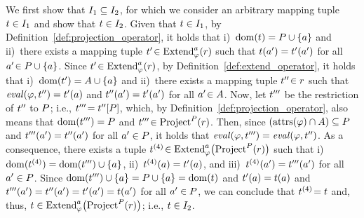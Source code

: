 	We first show that $I_1 \subseteq I_2$, for which we consider an arbitrary mapping tuple~$t \in I_1$ and show that $t \in I_2$.
	Given that $t \in I_1$, by Definition~\ref{def:projection_operator}, it holds that i)~$\mathrm{dom}(t)=P \cup \{a\}$ and ii)~there exists a mapping tuple $t'\! \in \text{Extend}_{\varphi}^{a}(r)$ such that $t(a') = t'(a')$ for all $a'\! \in P \cup \{a\}$.
	Since $t'\! \in \text{Extend}_{\varphi}^{a}(r)$, by Definition~\ref{def:extend_operator}, it holds that i)~$\mathrm{dom}(t') = A \cup \{a\}$ and ii)~there exists a mapping tuple $t''\! \in r$ such that $\mathit{eval}(\varphi,t'') = t'(a)$ and $t''(a') = t'(a')$ for all $a'\! \in A$.
	Now, let $t'''$ be the restriction of $t''$ to $P$; i.e., $t'''\! = t''[P]$, which, by Definition~\ref{def:projection_operator}, also means that $\mathrm{dom}(t''') = P$ and $t'''\! \in \text{Project}^{P}(r)$.
	Then, since $( \mathrm{attrs}(\varphi) \cap A ) \subseteq P$ and $t'''(a') = t''(a')$ for all $a' \in P$, it holds that $\mathit{eval}(\varphi,t''') = \mathit{eval}(\varphi,t'')$.
	As a consequence, there exists a tuple $t^{(4)}\! \in \text{Extend}_{\varphi}^{a}\bigl( \text{Project}^{P}(r) \bigr)$ such that i)~$\mathrm{dom}(t^{(4)}) = \mathrm{dom}(t''') \cup \{a\}$, ii)~$t^{(4)}(a) = t'(a)$, and iii)~$t^{(4)}(a') = t'''(a')$ for all $a' \in P$.
	Since $\mathrm{dom}(t''') \cup \{a\} = P \cup \{a\} = \mathrm{dom}(t)$ and $t'(a) = t(a)$ and $t'''(a') = t''(a') = t'(a') = t(a')$ for all $a' \in P$, we can conclude that $t^{(4)}\! = t$ and, thus, $t \in \text{Extend}_{\varphi}^{a}\bigl( \text{Project}^{P}(r) \bigr)$; i.e., $t \in I_2$.

